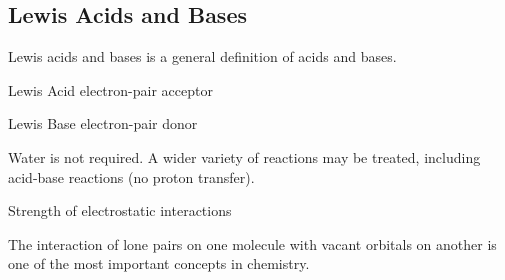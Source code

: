 \begin{mdframed}
\begin{multicols}{2}
\subsection{Lewis Acids and Bases}
\begin{compactdesc}
    \item[Lewis acids and bases] is a general definition of acids and bases.
    \item[Lewis Acid] electron-pair acceptor
    \item[Lewis Base] electron-pair donor
    \item[Water] is not required. A wider variety of reactions may be treated,
        including acid-base reactions (no proton transfer).
    \item[Strength of electrostatic] interactions
    \item[The interaction of lone pairs] on one molecule with vacant orbitals
        on another is one of the most important concepts in chemistry.
\end{compactdesc}
\end{multicols}
\end{mdframed}







